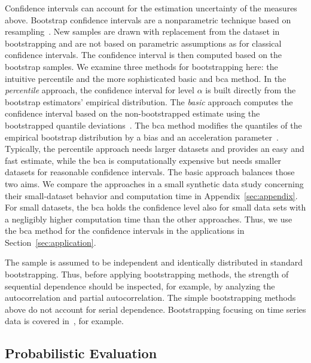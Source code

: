 Confidence intervals can account for the estimation uncertainty of the measures above.
Bootstrap confidence intervals are a nonparametric technique based on resampling~\parencite[for introductions see][]{Hesterberg2011,Bittmann2021}.
New samples are drawn with replacement from the dataset in bootstrapping and are not based on parametric assumptions as for classical confidence intervals.
The confidence interval is then computed based on the bootstrap samples.
We examine three methods for bootstrapping here: the intuitive percentile and the more sophisticated basic and \ac{bca} method.
In the \textit{percentile} approach, the confidence interval for level $\alpha$ is built directly from the bootstrap estimators' empirical distribution.
The \textit{basic} approach computes the confidence interval based on the non-bootstrapped estimate using the bootstrapped quantile deviations~\parencite{Davison1997}.
The \ac{bca} method modifies the quantiles of the empirical bootstrap distribution by a bias and an acceleration parameter~\parencite{Efron1987}.
Typically, the percentile approach needs larger datasets and provides an easy and fast estimate, while the \ac{bca} is computationally expensive but needs smaller datasets for reasonable confidence intervals.
The basic approach balances those two aims.
We compare the approaches in a small synthetic data study concerning their small-dataset behavior and computation time in Appendix~\ref{sec:appendix}.
For small datasets, the \ac{bca} holds the confidence level also for small data sets with a negligibly higher computation time than the other approaches.
Thus, we use the \ac{bca} method for the confidence intervals in the applications in Section~\ref{sec:application}.

The sample is assumed to be independent and identically distributed in standard bootstrapping.
Thus, before applying bootstrapping methods, the strength of sequential dependence should be inspected, for example, by analyzing the autocorrelation and partial autocorrelation.
The simple bootstrapping methods above do not account for serial dependence. 
Bootstrapping focusing on time series data is covered in~\textcite{Hardle2003,Kreiss2012}, for example.

\subsection{Probabilistic Evaluation}

